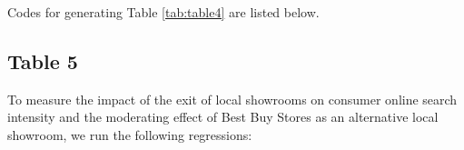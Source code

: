 \documentclass{article}
\begin{document}
Codes for generating Table \ref{tab:table4} are listed below.


\pagebreak
\subsection{Table 5}
To measure the impact of the exit of local showrooms on consumer online
search intensity and the moderating effect of Best Buy Stores as an alternative local showroom, we run the following regressions:
\end{document}
